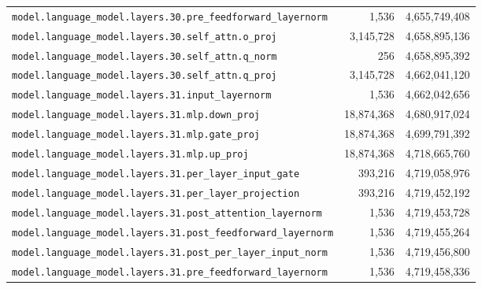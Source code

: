 \documentclass[10pt,a4paper]{article}
\theoremstyle{definition}
\begin{document}
\begin{appendices}
\begin{longtable}{p{9.5cm}rr}
\texttt{model.\allowbreak{}language\_model.\allowbreak{}layers.\allowbreak{}30.\allowbreak{}pre\_feedforward\_layernorm} & 1,536 & 4,655,749,408 \\
\texttt{model.\allowbreak{}language\_model.\allowbreak{}layers.\allowbreak{}30.\allowbreak{}self\_attn.\allowbreak{}o\_proj} & 3,145,728 & 4,658,895,136 \\
\texttt{model.\allowbreak{}language\_model.\allowbreak{}layers.\allowbreak{}30.\allowbreak{}self\_attn.\allowbreak{}q\_norm} & 256 & 4,658,895,392 \\
\texttt{model.\allowbreak{}language\_model.\allowbreak{}layers.\allowbreak{}30.\allowbreak{}self\_attn.\allowbreak{}q\_proj} & 3,145,728 & 4,662,041,120 \\
\texttt{model.\allowbreak{}language\_model.\allowbreak{}layers.\allowbreak{}31.\allowbreak{}input\_layernorm} & 1,536 & 4,662,042,656 \\
\texttt{model.\allowbreak{}language\_model.\allowbreak{}layers.\allowbreak{}31.\allowbreak{}mlp.\allowbreak{}down\_proj} & 18,874,368 & 4,680,917,024 \\
\texttt{model.\allowbreak{}language\_model.\allowbreak{}layers.\allowbreak{}31.\allowbreak{}mlp.\allowbreak{}gate\_proj} & 18,874,368 & 4,699,791,392 \\
\texttt{model.\allowbreak{}language\_model.\allowbreak{}layers.\allowbreak{}31.\allowbreak{}mlp.\allowbreak{}up\_proj} & 18,874,368 & 4,718,665,760 \\
\texttt{model.\allowbreak{}language\_model.\allowbreak{}layers.\allowbreak{}31.\allowbreak{}per\_layer\_input\_gate} & 393,216 & 4,719,058,976 \\
\texttt{model.\allowbreak{}language\_model.\allowbreak{}layers.\allowbreak{}31.\allowbreak{}per\_layer\_projection} & 393,216 & 4,719,452,192 \\
\texttt{model.\allowbreak{}language\_model.\allowbreak{}layers.\allowbreak{}31.\allowbreak{}post\_attention\_layernorm} & 1,536 & 4,719,453,728 \\
\texttt{model.\allowbreak{}language\_model.\allowbreak{}layers.\allowbreak{}31.\allowbreak{}post\_feedforward\_layernorm} & 1,536 & 4,719,455,264 \\
\texttt{model.\allowbreak{}language\_model.\allowbreak{}layers.\allowbreak{}31.\allowbreak{}post\_per\_layer\_input\_norm} & 1,536 & 4,719,456,800 \\
\texttt{model.\allowbreak{}language\_model.\allowbreak{}layers.\allowbreak{}31.\allowbreak{}pre\_feedforward\_layernorm} & 1,536 & 4,719,458,336 \\

\end{longtable}
\end{appendices}
\end{document}
